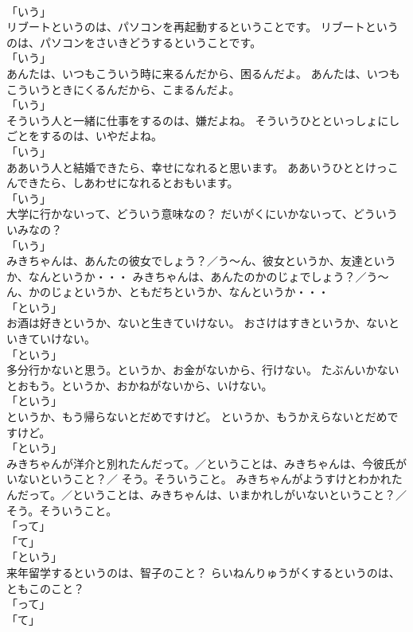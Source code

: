 \documentclass[8pt]{extreport}
\begin{document}
\begin{CJK}{UTF8}{min}
\\	「いう」 
\\	リブートというのは、パソコンを再起動するということです。	リブートというのは、パソコンをさいきどうするということです。	
\\	「いう」 
\\	あんたは、いつもこういう時に来るんだから、困るんだよ。	あんたは、いつもこういうときにくるんだから、こまるんだよ。	
\\	「いう」 
\\	そういう人と一緒に仕事をするのは、嫌だよね。	そういうひとといっしょにしごとをするのは、いやだよね。	
\\	「いう」 
\\	ああいう人と結婚できたら、幸せになれると思います。	ああいうひととけっこんできたら、しあわせになれるとおもいます。	
\\	「いう」 
\\	大学に行かないって、どういう意味なの？	だいがくにいかないって、どういういみなの？	
\\	「いう」 
\\	みきちゃんは、あんたの彼女でしょう？／う～ん、彼女というか、友達というか、なんというか・・・	みきちゃんは、あんたのかのじょでしょう？／う～ん、かのじょというか、ともだちというか、なんというか・・・	
\\	「という」	
\\	お酒は好きというか、ないと生きていけない。	おさけはすきというか、ないといきていけない。	
\\	「という」	
\\	多分行かないと思う。というか、お金がないから、行けない。	たぶんいかないとおもう。というか、おかねがないから、いけない。	
\\	「という」	
\\	というか、もう帰らないとだめですけど。	というか、もうかえらないとだめですけど。	
\\	「という」	
\\	みきちゃんが洋介と別れたんだって。／ということは、みきちゃんは、今彼氏がいないということ？／ そう。そういうこと。	みきちゃんがようすけとわかれたんだって。／ということは、みきちゃんは、いまかれしがいないということ？／ そう。そういうこと。	
\\	「って」 
\\	「て」 
\\	「という」	
\\	来年留学するというのは、智子のこと？	らいねんりゅうがくするというのは、ともこのこと？	
\\	「って」 
\\	「て」 

\end{CJK}
\end{document}
